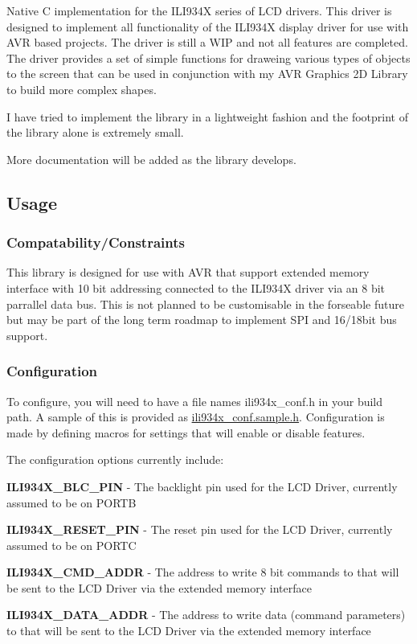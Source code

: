 Native C implementation for the I\+L\+I934\+X series of L\+C\+D drivers. This driver is designed to implement all functionality of the I\+L\+I934\+X display driver for use with A\+V\+R based projects. The driver is still a W\+I\+P and not all features are completed. The driver provides a set of simple functions for draweing various types of objects to the screen that can be used in conjunction with my A\+V\+R Graphics 2\+D Library to build more complex shapes.

I have tried to implement the library in a lightweight fashion and the footprint of the library alone is extremely small.

More documentation will be added as the library develops.

\subsection*{Usage }

\subsubsection*{Compatability/\+Constraints}

This library is designed for use with A\+V\+R that support extended memory interface with 10 bit addressing connected to the I\+L\+I934\+X driver via an 8 bit parrallel data bus. This is not planned to be customisable in the forseable future but may be part of the long term roadmap to implement S\+P\+I and 16/18bit bus support.

\subsubsection*{Configuration}

To configure, you will need to have a file names {\ttfamily ili934x\+\_\+conf.\+h} in your build path. A sample of this is provided as {\ttfamily \hyperlink{ili934x__conf_8sample_8h_source}{ili934x\+\_\+conf.\+sample.\+h}}. Configuration is made by defining macros for settings that will enable or disable features.

The configuration options currently include\+:


\begin{DoxyItemize}
\item {\bfseries I\+L\+I934\+X\+\_\+\+B\+L\+C\+\_\+\+P\+I\+N} -\/ The backlight pin used for the L\+C\+D Driver, currently assumed to be on {\ttfamily P\+O\+R\+T\+B}
\item {\bfseries I\+L\+I934\+X\+\_\+\+R\+E\+S\+E\+T\+\_\+\+P\+I\+N} -\/ The reset pin used for the L\+C\+D Driver, currently assumed to be on {\ttfamily P\+O\+R\+T\+C}
\item {\bfseries I\+L\+I934\+X\+\_\+\+C\+M\+D\+\_\+\+A\+D\+D\+R} -\/ The address to write 8 bit commands to that will be sent to the L\+C\+D Driver via the extended memory interface
\item {\bfseries I\+L\+I934\+X\+\_\+\+D\+A\+T\+A\+\_\+\+A\+D\+D\+R} -\/ The address to write data (command parameters) to that will be sent to the L\+C\+D Driver via the extended memory interface
\end{DoxyItemize}

